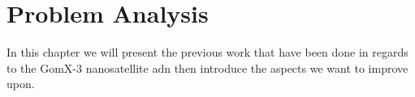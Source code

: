 \chapter{Problem Analysis} \label{cha:problem}
In this chapter we will present the previous work that have been done in regards to the GomX-3 nanosatellite adn then introduce the aspects we want to improve upon.




